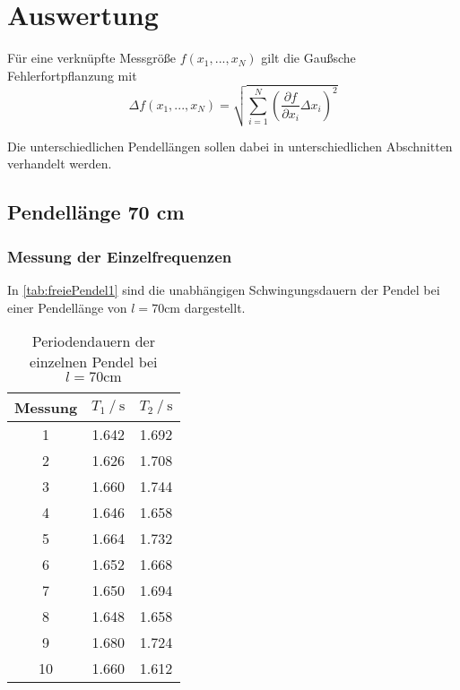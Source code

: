 \section{Auswertung}
\label{sec:Auswertung}
Für eine verknüpfte Messgröße $f(x_1,...,x_N)$ gilt die Gaußsche Fehlerfortpflanzung mit
\begin{equation}
Δf(x_1,...,x_N)=\sqrt{\sum_{i=1}^N (\frac{\partial f}{\partial x_i}Δx_i)^2}
\label{eq:gaussF}
\end{equation}


Die unterschiedlichen Pendellängen sollen dabei in unterschiedlichen Abschnitten verhandelt werden.

\subsection{Pendellänge 70 cm}
\subsubsection{Messung der Einzelfrequenzen} \label{sec:Einzfrel1}

In \autoref{tab:freiePendel1} sind die unabhängigen Schwingungsdauern der Pendel bei einer Pendellänge von $l=70 \unit{\centi\meter}$ dargestellt.

\begin{table}[H]
  \centering
  \caption{Periodendauern der einzelnen Pendel bei $l=70 \unit{\centi\meter}$}
  \label{tab:freiePendel1}
  \begin{tabular}{S[table-format=2.0] S S}
    \toprule
    {Messung} & {$T_1 \mathbin{/} \unit{\second}$} & {$T_2 \mathbin{/} \unit{\second}$} \\
     & 1.642 & 1.692 \\
    2 & 1.626 & 1.708 \\
    3 & 1.660 & 1.744 \\
    4 & 1.646 & 1.658 \\
    5 & 1.664 & 1.732 \\
    6 & 1.652 & 1.668 \\
    7 & 1.650 & 1.694 \\
    8 & 1.648 & 1.658 \\
    9 & 1.680 & 1.724 \\
   10 & 1.660 & 1.612 \\
    \bottomrule
  \end{tabular}
\end{table}

